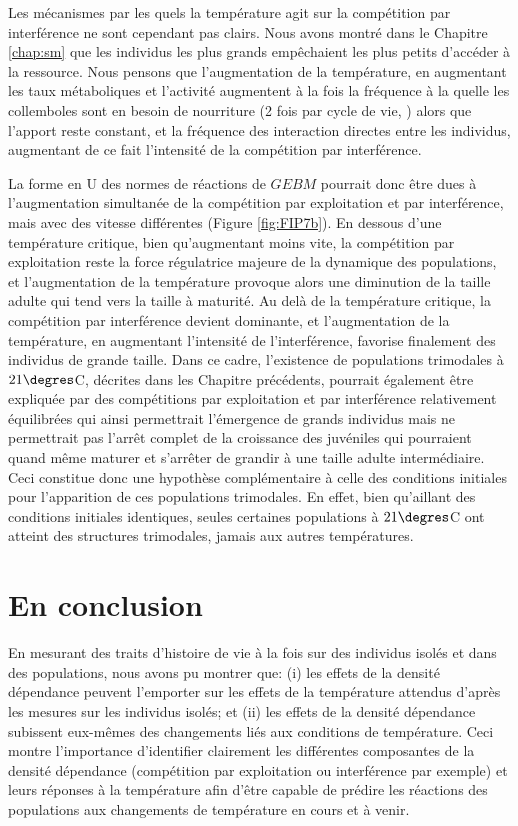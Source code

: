 Les mécanismes par les quels la température agit sur la compétition par
interférence ne sont cependant pas clairs. Nous avons montré dans le Chapitre
\ref{chap:sm} que les individus les plus grands empêchaient les plus petits
d'accéder à la ressource. Nous pensons que l'augmentation de la température, en
augmentant les taux métaboliques et l'activité augmentent à la fois la fréquence
à la quelle les collemboles sont en besoin de nourriture (2 fois par cycle de
vie, \citealp{palevody1974a}) alors que l'apport reste constant, et la fréquence
des interaction directes entre les individus, augmentant de ce fait l'intensité
de la compétition par interférence. 

La forme en U des normes de réactions de $GEBM$ pourrait donc être dues à
l'augmentation simultanée de la compétition par exploitation et par
interférence, mais avec des vitesse différentes (Figure \ref{fig:FIP7b}). En
dessous d'une température critique, bien qu'augmentant moins vite, la
compétition par exploitation reste la force régulatrice majeure de la dynamique
des populations, et l'augmentation de la température provoque alors une
diminution de la taille adulte qui tend vers la taille à maturité. Au delà de la
température critique, la compétition par interférence devient dominante, et
l'augmentation de la température, en augmentant l'intensité de l'interférence,
favorise finalement des individus de grande taille. Dans ce cadre, l'existence
de populations trimodales à $21\degres$C, décrites dans les Chapitre précédents,
pourrait également être expliquée par des compétitions par exploitation et par
interférence relativement équilibrées qui ainsi permettrait l'émergence de
grands individus mais ne permettrait pas l'arrêt complet de la croissance des
juvéniles qui pourraient quand même maturer et s'arrêter de grandir à une taille
adulte intermédiaire. Ceci constitue donc une hypothèse complémentaire à
celle des conditions initiales pour l'apparition de ces populations trimodales.
En effet, bien qu'aillant des conditions initiales identiques, seules certaines
populations à $21\degres$C ont atteint des structures trimodales, jamais aux
autres températures. 

\section{En conclusion}

En mesurant des traits d'histoire de vie à la fois sur des individus isolés et
dans des populations, nous avons pu montrer que: (i) les effets de la densité
dépendance peuvent l'emporter sur les effets de la température attendus d'après
les mesures sur les individus isolés; et (ii) les effets de la densité
dépendance subissent eux-mêmes des changements liés aux conditions de
température. Ceci montre l'importance d'identifier clairement les différentes
composantes de la densité dépendance (compétition par exploitation ou
interférence par exemple) et leurs réponses à la température afin d'être capable
de prédire les réactions des populations aux changements de température en cours
et à venir. 
